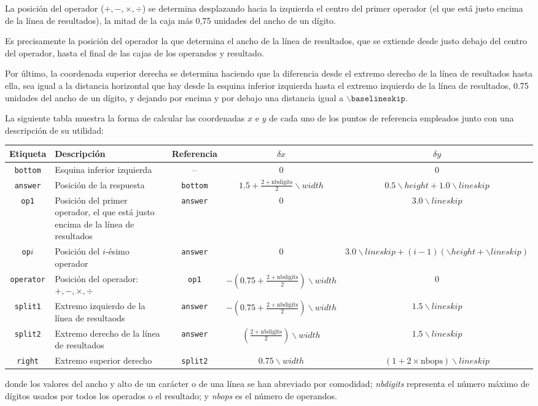 \documentclass[svgnames,addpoints]{exam}
\begin{document}
La posición del operador ($+, -, \times, \div$) se determina desplazando hacia
la izquierda el centro del primer operador (el que está justo encima de la
línea de resultados), la mitad de la caja más 0,75 unidades del ancho de un
dígito.

Es precisamente la posición del operador la que determina el ancho de la línea
de resultados, que se extiende desde justo debajo del centro del operador,
hasta el final de las cajas de los operandos y resultado.

Por último, la coordenada superior derecha se determina haciendo que la
diferencia desde el extremo derecho de la línea de resultados hasta ella, sea
igual a la distancia horizontal que hay desde la esquina inferior izquierda
hasta el extremo izquierdo de la línea de resultados, 0.75 unidades del ancho
de un dígito, y dejando por encima y por debajo una distancia igual a
$\backslash\mathtt{baselineskip}$.

La siguiente tabla muestra la forma de calcular las coordenadas $x$ e $y$ de
cada uno de los puntos de referencia empleados junto con una descripción de su
utilidad:

\begin{center}
  \begin{tabular}{c|p{2.0cm}|c|c|c}
    Etiqueta & Descripción & Referencia & $\delta x$ & $\delta y$ \\ \toprule
    \texttt{bottom} & Esquina inferior izquierda & -- & 0 & 0 \\ \midrule
    \texttt{answer} & Posición de la respuesta & \texttt{bottom}&  $1.5+\frac{2+\textrm{nbdigits}}{2}\backslash width$ & $0.5\backslash height+1.0\backslash lineskip$ \\  \midrule
    \texttt{op1} & Posición del primer operador, el que está justo encima de la línea de resultados & \texttt{answer} & 0 & $3.0\backslash lineskip$ \\  \midrule
    \texttt{op}$i$ & Posición del $i$-ésimo operador & \texttt{answer} & 0 & $3.0\backslash lineskip + (i-1) (\backslash height + \backslash lineskip)$ \\  \midrule
    \texttt{operator} & Posición del operador: $+, -, \times, \div$ & \texttt{op1} & $-\left(0.75+\frac{2+\textrm{nbdigits}}{2}\right)\backslash width$ & 0 \\  \midrule
    \texttt{split1} & Extremo izquierdo de la línea de resultaods & \texttt{answer} & $-\left(0.75+\frac{2+\textrm{nbdigits}}{2}\right)\backslash width$ & $1.5\backslash lineskip$ \\  \midrule
    \texttt{split2} & Extremo derecho de la línea de resultados & \texttt{answer} & $\left(\frac{2+\textrm{nbdigits}}{2}\right)\backslash width$ & $1.5\backslash lineskip$ \\ \midrule
    \texttt{right} & Extremo superior derecho & \texttt{split2} & $0.75\backslash width$ & $(1 + 2\times \mathrm{nbops})\backslash lineskip$ \\ \bottomrule
  \end{tabular}
\end{center}

\noindent
donde los valores del ancho y alto de un carácter o de una línea se han
abreviado por comodidad; \textit{nbdigits} representa el número máximo de
dígitos usados por todos los operados o el resultado; y \textit{nbops} es el
número de operandos.
\end{document}
